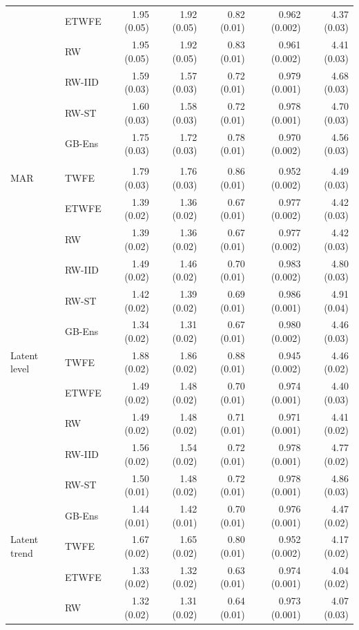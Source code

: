 \begin{table}
\begin{tabular*}{1\linewidth}{@{\extracolsep{\fill}}llrrrrr}
 & ETWFE & 1.95 (0.05) & 1.92 (0.05) & 0.82 (0.01) & 0.962 (0.002) & 4.37 (0.03) \\ 
 & RW & 1.95 (0.05) & 1.92 (0.05) & 0.83 (0.01) & 0.961 (0.002) & 4.41 (0.03) \\ 
 & RW-IID & 1.59 (0.03) & 1.57 (0.03) & 0.72 (0.01) & 0.979 (0.001) & 4.68 (0.03) \\ 
 & RW-ST & 1.60 (0.03) & 1.58 (0.03) & 0.72 (0.01) & 0.978 (0.001) & 4.70 (0.03) \\ 
 & GB-Ens & 1.75 (0.03) & 1.72 (0.03) & 0.78 (0.01) & 0.970 (0.002) & 4.56 (0.03) \\ 
\midrule\addlinespace[2.5pt]
\multicolumn{7}{l}{With covariates} \\[2.5pt] 
\midrule\addlinespace[2.5pt]
MAR & TWFE & 1.79 (0.03) & 1.76 (0.03) & 0.86 (0.01) & 0.952 (0.002) & 4.49 (0.03) \\ 
 & ETWFE & 1.39 (0.02) & 1.36 (0.02) & 0.67 (0.01) & 0.977 (0.002) & 4.42 (0.03) \\ 
 & RW & 1.39 (0.02) & 1.36 (0.02) & 0.67 (0.01) & 0.977 (0.002) & 4.42 (0.03) \\ 
 & RW-IID & 1.49 (0.02) & 1.46 (0.02) & 0.70 (0.01) & 0.983 (0.002) & 4.80 (0.03) \\ 
 & RW-ST & 1.42 (0.02) & 1.39 (0.02) & 0.69 (0.01) & 0.986 (0.001) & 4.91 (0.04) \\ 
 & GB-Ens & 1.34 (0.02) & 1.31 (0.02) & 0.67 (0.01) & 0.980 (0.002) & 4.46 (0.03) \\ 
Latent level & TWFE & 1.88 (0.02) & 1.86 (0.02) & 0.88 (0.01) & 0.945 (0.002) & 4.46 (0.02) \\ 
 & ETWFE & 1.49 (0.02) & 1.48 (0.02) & 0.70 (0.01) & 0.974 (0.001) & 4.40 (0.03) \\ 
 & RW & 1.49 (0.02) & 1.48 (0.02) & 0.71 (0.01) & 0.971 (0.001) & 4.41 (0.02) \\ 
 & RW-IID & 1.56 (0.02) & 1.54 (0.02) & 0.72 (0.01) & 0.978 (0.001) & 4.77 (0.02) \\ 
 & RW-ST & 1.50 (0.01) & 1.48 (0.02) & 0.72 (0.01) & 0.978 (0.001) & 4.86 (0.03) \\ 
 & GB-Ens & 1.44 (0.01) & 1.42 (0.01) & 0.70 (0.01) & 0.976 (0.001) & 4.47 (0.02) \\ 
Latent trend & TWFE & 1.67 (0.02) & 1.65 (0.02) & 0.80 (0.01) & 0.952 (0.002) & 4.17 (0.02) \\ 
 & ETWFE & 1.33 (0.02) & 1.32 (0.02) & 0.63 (0.01) & 0.974 (0.001) & 4.04 (0.02) \\ 
 & RW & 1.32 (0.02) & 1.31 (0.02) & 0.64 (0.01) & 0.973 (0.001) & 4.07 (0.03) \\ 

\end{tabular*}
\end{table}
